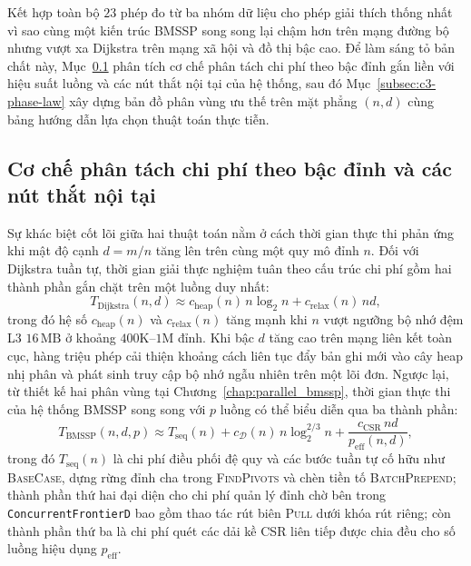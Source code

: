 Kết hợp toàn bộ $23$ phép đo từ ba nhóm dữ liệu cho phép giải thích thống nhất vì sao cùng một kiến trúc BMSSP song song lại chậm hơn trên mạng đường bộ nhưng vượt xa Dijkstra trên mạng xã hội và đồ thị bậc cao. Để làm sáng tỏ bản chất này, Mục~\ref{subsec:c3-co-che} phân tích cơ chế phân tách chi phí theo bậc đỉnh gắn liền với hiệu suất luồng và các nút thắt nội tại của hệ thống, sau đó Mục~\ref{subsec:c3-phase-law} xây dựng bản đồ phân vùng ưu thế trên mặt phẳng $(n, d)$ cùng bảng hướng dẫn lựa chọn thuật toán thực tiễn.

\subsection{Cơ chế phân tách chi phí theo bậc đỉnh và các nút thắt nội tại}\label{subsec:c3-co-che}

Sự khác biệt cốt lõi giữa hai thuật toán nằm ở cách thời gian thực thi phản ứng khi mật độ cạnh $d = m/n$ tăng lên trên cùng một quy mô đỉnh $n$. Đối với Dijkstra tuần tự, thời gian giải thực nghiệm tuân theo cấu trúc chi phí gồm hai thành phần gắn chặt trên một luồng duy nhất:
\begin{equation}
    T_{\mathrm{Dijkstra}}(n, d) \approx c_{\mathrm{heap}}(n)\,n\log_2 n + c_{\mathrm{relax}}(n)\,n d,
    \label{eq:emp-dijkstra}
\end{equation}
trong đó hệ số $c_{\mathrm{heap}}(n)$ và $c_{\mathrm{relax}}(n)$ tăng mạnh khi $n$ vượt ngưỡng bộ nhớ đệm L3 $16\,\mathrm{MB}$ ở khoảng $400\mathrm{K}$--$1\mathrm{M}$ đỉnh. Khi bậc $d$ tăng cao trên mạng liên kết toàn cục, hàng triệu phép cải thiện khoảng cách liên tục đẩy bản ghi mới vào cây heap nhị phân và phát sinh truy cập bộ nhớ ngẫu nhiên trên một lõi đơn. Ngược lại, từ thiết kế hai phân vùng tại Chương~\ref{chap:parallel_bmssp}, thời gian thực thi của hệ thống BMSSP song song với $p$ luồng có thể biểu diễn qua ba thành phần:
\begin{equation}
    T_{\mathrm{BMSSP}}(n, d, p) \approx T_{\mathrm{seq}}(n) + c_{\mathcal{D}}(n)\,n\log_2^{2/3} n + \frac{c_{\mathrm{CSR}}\,n d}{p_{\mathrm{eff}}(n, d)},
    \label{eq:emp-bmssp}
\end{equation}
trong đó $T_{\mathrm{seq}}(n)$ là chi phí điều phối đệ quy và các bước tuần tự cố hữu như \textsc{BaseCase}, dựng rừng đỉnh cha trong \textsc{FindPivots} và chèn tiền tố \textsc{BatchPrepend}; thành phần thứ hai đại diện cho chi phí quản lý đỉnh chờ bên trong \texttt{Concurrent\allowbreak FrontierD} bao gồm thao tác rút biên \textsc{Pull} dưới khóa rút riêng; còn thành phần thứ ba là chi phí quét các dải kề CSR liên tiếp được chia đều cho số luồng hiệu dụng $p_{\mathrm{eff}}$.

